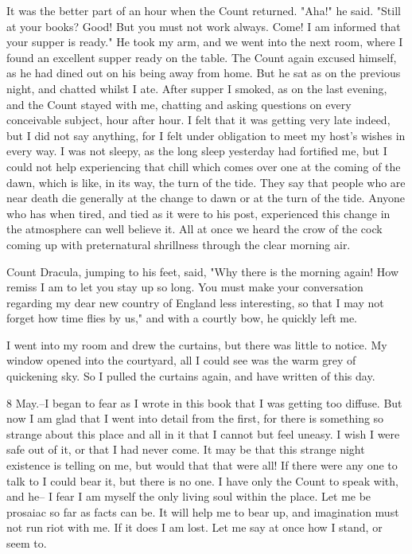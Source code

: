 It was the better part of an hour when the Count returned. "Aha!" he said. "Still at your books? Good! But you must not work always. Come! I am informed that your supper is ready." He took my arm, and we went into the next room, where I found an excellent supper ready on the table. The Count again excused himself, as he had dined out on his being away from home. But he sat as on the previous night, and chatted whilst I ate. After supper I smoked, as on the last evening, and the Count stayed with me, chatting and asking questions on every conceivable subject, hour after hour. I felt that it was getting very late indeed, but I did not say anything, for I felt under obligation to meet my host's wishes in every way. I was not sleepy, as the long sleep yesterday had fortified me, but I could not help experiencing that chill which comes over one at the coming of the dawn, which is like, in its way, the turn of the tide. They say that people who are near death die generally at the change to dawn or at the turn of the tide. Anyone who has when tired, and tied as it were to his post, experienced this change in the atmosphere can well believe it. All at once we heard the crow of the cock coming up with preternatural shrillness through the clear morning air. 

Count Dracula, jumping to his feet, said, "Why there is the morning again! How remiss I am to let you stay up so long. You must make your conversation regarding my dear new country of England less interesting, so that I may not forget how time flies by us," and with a courtly bow, he quickly left me. 

I went into my room and drew the curtains, but there was little to notice. My window opened into the courtyard, all I could see was the warm grey of quickening sky. So I pulled the curtains again, and have written of this day. 

8 May.--I began to fear as I wrote in this book that I was getting too diffuse. But now I am glad that I went into detail from the first, for there is something so strange about this place and all in it that I cannot but feel uneasy. I wish I were safe out of it, or that I had never come. It may be that this strange night existence is telling on me, but would that that were all! If there were any one to talk to I could bear it, but there is no one. I have only the Count to speak with, and he-- I fear I am myself the only living soul within the place. Let me be prosaiac so far as facts can be. It will help me to bear up, and imagination must not run riot with me. If it does I am lost. Let me say at once how I stand, or seem to. 

